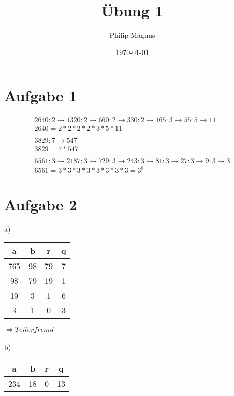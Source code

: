 \documentclass[a4paper, 10pt]{article}
\title{Übung 1}
\author{Philip Magnus}
\date{\today}
\begin{document}
\maketitle
\section*{Aufgabe 1}

\begin{align*}
2640:2 \xrightarrow{} 1320:2 \xrightarrow{} 660:2 \xrightarrow{} 330:2 \xrightarrow{} 165:3 \xrightarrow{} 55:5 \xrightarrow{} 11\tag{a}
\\
2640 = 2*2*2*2*3*5*11
\\
\\
3829:7 \xrightarrow{} 547\tag{b}
\\
3829 = 7*547
\\
\\
6561:3 \xrightarrow{} 2187:3 \xrightarrow{} 729:3 \xrightarrow{} 243:3 \xrightarrow{} 81:3 \xrightarrow{} 27:3 \xrightarrow{} 9:3 \xrightarrow{} 3\tag{c}
\\
6561 = 3*3*3*3*3*3*3*3 = 3^{8}
\end{align*}

\section*{Aufgabe 2}

a)

\begin{center}
    \begin{tabular}{c|c|c|c} 
     \hline
     a & b & r & q \\ [0.5ex] 
     \hline\hline
     765 & 98 & 79 & 7 \\ 
     \hline
     98 & 79 & 19 & 1 \\
     \hline
     19 & 3 & 1 & 6 \\
     \hline
     3 & 1 & 0 & 3 \\
     \hline
    \end{tabular}
\end{center}

$\Rightarrow Teilerfremd$
\\
\\
b)

\begin{center}
    \begin{tabular}{c|c|c|c} 
     \hline
     a & b & r & q \\ [0.5ex] 
     \hline\hline
     234 & 18 & 0 & 13 \\ 
     \hline
    \end{tabular}
\end{center}
\end{document}
